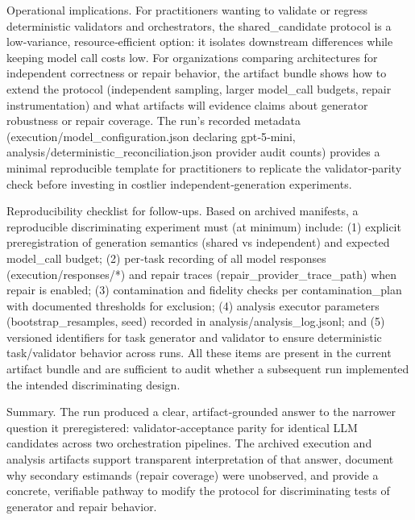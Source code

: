 \documentclass[conference]{IEEEtran}
\begin{document}
Operational implications. For practitioners wanting to validate or regress deterministic validators and orchestrators, the shared\_candidate protocol is a low‑variance, resource‑efficient option: it isolates downstream differences while keeping model call costs low. For organizations comparing architectures for independent correctness or repair behavior, the artifact bundle shows how to extend the protocol (independent sampling, larger model\_call budgets, repair instrumentation) and what artifacts will evidence claims about generator robustness or repair coverage. The run's recorded metadata (execution/model\_configuration.json declaring gpt‑5‑mini, analysis/deterministic\_reconciliation.json provider audit counts) provides a minimal reproducible template for practitioners to replicate the validator‑parity check before investing in costlier independent‑generation experiments.

Reproducibility checklist for follow‑ups. Based on archived manifests, a reproducible discriminating experiment must (at minimum) include: (1) explicit preregistration of generation semantics (shared vs independent) and expected model\_call budget; (2) per‑task recording of all model responses (execution/responses/*) and repair traces (repair\_provider\_trace\_path) when repair is enabled; (3) contamination and fidelity checks per contamination\_plan with documented thresholds for exclusion; (4) analysis executor parameters (bootstrap\_resamples, seed) recorded in analysis/analysis\_log.jsonl; and (5) versioned identifiers for task generator and validator to ensure deterministic task/validator behavior across runs. All these items are present in the current artifact bundle and are sufficient to audit whether a subsequent run implemented the intended discriminating design.

Summary. The run produced a clear, artifact‑grounded answer to the narrower question it preregistered: validator‑acceptance parity for identical LLM candidates across two orchestration pipelines. The archived execution and analysis artifacts support transparent interpretation of that answer, document why secondary estimands (repair coverage) were unobserved, and provide a concrete, verifiable pathway to modify the protocol for discriminating tests of generator and repair behavior.
\end{document}
